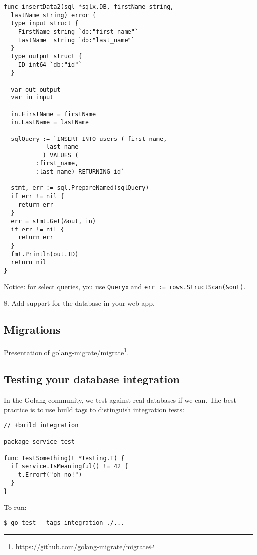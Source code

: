 \documentclass[11pt, letterpaper]{article}
\begin{document}
\begin{verbatim}
func insertData2(sql *sqlx.DB, firstName string,
  lastName string) error {
  type input struct {
    FirstName string `db:"first_name"`
    LastName  string `db:"last_name"`
  }
  type output struct {
    ID int64 `db:"id"`
  }

  var out output
  var in input

  in.FirstName = firstName
  in.LastName = lastName

  sqlQuery := `INSERT INTO users ( first_name,
            last_name
           ) VALUES (
         :first_name,
         :last_name) RETURNING id`

  stmt, err := sql.PrepareNamed(sqlQuery)
  if err != nil {
    return err
  }
  err = stmt.Get(&out, in)
  if err != nil {
    return err
  }
  fmt.Println(out.ID)
  return nil
}
\end{verbatim}

Notice: for select queries, you use \verb|Queryx| and \verb|err := rows.StructScan(&out)|.

\bigskip

8. Add support for the database in your web app.

\subsection{Migrations}

Presentation of golang-migrate/migrate\footnote{\href{https://github.com/golang-migrate/migrate}{https://github.com/golang-migrate/migrate}}.

\subsection{Testing your database integration}

In the Golang community, we test against real databases if we can. The best practice is to use build tags to distinguish integration tests:

\begin{verbatim}
// +build integration

package service_test

func TestSomething(t *testing.T) {
  if service.IsMeaningful() != 42 {
    t.Errorf("oh no!")
  }
}
\end{verbatim}

To run:

\begin{verbatim}
$ go test --tags integration ./...
\end{verbatim}
\end{document}
